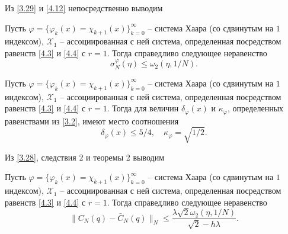 Из \eqref{3.29} и \eqref{4.12} непосредственно выводим
\begin{corollary}
  Пусть $\varphi=\{\varphi_k(x)=\chi_{k+1}(x)\}_{k=0}^\infty$ -- система Хаара (со сдвинутым на $1$ индексом), $\mathcal{ X}_1$ -- ассоциированная с ней система, определенная посредством равенств \eqref{4.3} и \eqref{4.4} с $r=1$.
Тогда   справедливо следующее неравенство
$$\sigma_N^{\varphi}(\eta)\le \omega_2(\eta,1/N).$$
\end{corollary}
\begin{theorem}
  Пусть $\varphi=\{\varphi_k(x)=\chi_{k+1}(x)\}_{k=0}^\infty$ -- система Хаара (со сдвинутым на $1$ индексом), $\mathcal{ X}_1$ -- ассоциированная с ней система, определенная посредством равенств \eqref{4.3} и \eqref{4.4} с $r=1$. Тогда для величин $\delta_\varphi(x)$ и $\kappa_\varphi$, определенных равенствами из \eqref{3.2}, имеют место соотношения
 $$
\delta_\varphi(x)\le 5/4,\quad\kappa_{\varphi}=\sqrt{1/2}.
$$
\end{theorem}

Из \eqref{3.28}, следствия 2 и теоремы 2 выводим
\begin{corollary}
  Пусть $\varphi=\{\varphi_k(x)=\chi_{k+1}(x)\}_{k=0}^\infty$ -- система Хаара (со сдвинутым на $1$ индексом), $\mathcal{ X}_1$ -- ассоциированная с ней система, определенная посредством равенств \eqref{4.3} и \eqref{4.4} с $r=1$.
Тогда   справедливо следующее неравенство
$$\|C_N(q)-\bar C_N(q)\|_N\le \frac{\lambda \sqrt{2}\omega_2(\eta,1/N)}{\sqrt{2}-h\lambda}.$$
\end{corollary}




